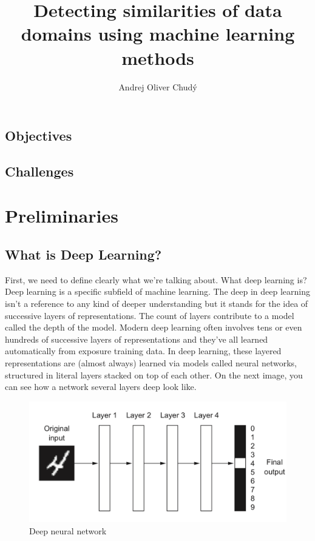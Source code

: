 \documentclass[thesis=M,english]{FITthesis}[2012/10/20]
\title{Detecting similarities of data domains using machine learning methods}
\author{Andrej Oliver Chud\'y} %
\begin{document}
\begin{introduction}

	\section{Objectives}

	\section{Challenges}

\end{introduction}

\chapter{Preliminaries}

\section{What is Deep Learning?}
First, we need to define clearly what we're talking about. What deep learning is? Deep learning is a specific subfield of machine learning. The deep in deep learning isn't a reference to any kind of deeper understanding but it stands for the idea of successive layers of representations. The count of layers contribute to a model called the depth of the model. Modern deep learning often involves tens or even hundreds of successive layers of representations and they've all learned automatically from exposure training data. In deep learning, these layered representations are (almost always) learned via models called neural networks, structured in literal layers stacked on top of each other. On the next image, you can see how a network several layers deep look like.


\begin{figure}\centering
	\includegraphics[scale=0.6]{images/deep_NN}
	\caption{Deep neural network}\label{fig:deep NN}
\end{figure}
\end{document}
